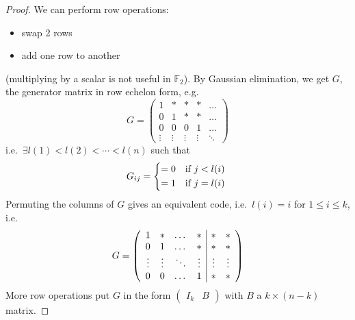 \documentclass{article}
\newcommand{\1}[1]{\mathbbm{1}_{#1}}
\begin{document}
\begin{proof}
    We can perform row operations:
    \begin{itemize}
        \item swap 2 rows
        \item add one row to another
    \end{itemize}
    (multiplying by a scalar is not useful in $\mathbb{F}_2$).
    By Gaussian elimination, we get $G$, the generator matrix in row echelon form, e.g.\
    \begin{equation*}
        G =
        \begin{pmatrix}
            1 & * & * & * & \dots \\
            0 & 1 & * & * & \dots \\
            0 & 0 & 0 & 1 & \dots \\
            \vdots & \vdots & \vdots & \vdots & \ddots
        \end{pmatrix}
    \end{equation*}
    i.e.\ $\exists l(1) < l(2) < \dotsb < l(n)$ such that
    \begin{equation*}
        G_{ij} =
        \begin{dcases*}
            = 0 & if $j < l(i)$ \\
            = 1 & if $j = l(i)$ \\
        \end{dcases*}
    \end{equation*}
    Permuting the columns of $G$ gives an equivalent code, i.e.\ $l(i) = i$ for $1 \leq i \leq k$, i.e.\
    \begin{equation*}
        G =
        \left(
            \begin{array}{c c c c | c c}
                1 & * & \dots & * & * & *\\
                0 & 1 & \dots & * & * & *\\
                \vdots & \vdots & \ddots & \vdots & \vdots & \vdots\\
                0 & 0 & \dots & 1 & * & *\\
            \end{array}
        \right)
    \end{equation*}
    More row operations put $G$ in the form $\left( \begin{array}{c|c} I_k & B \end{array}\right)$ with $B$ a $k \times (n-k)$ matrix.
\end{proof}
\end{document}

